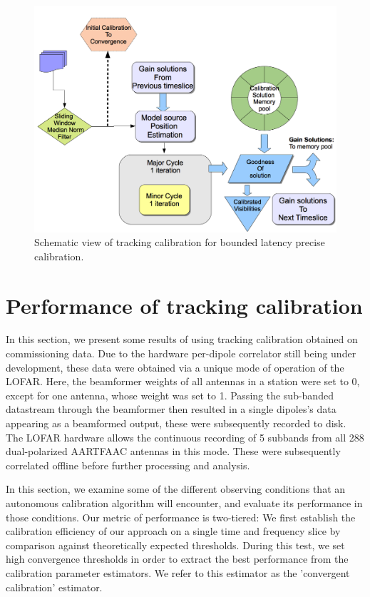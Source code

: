 \documentclass{aa}
\begin{document}
\begin{figure}[tbh]
\includegraphics[width=1\columnwidth]{Figs/tracking_cal_schematic}

\caption{\label{fig:trackcalSchematic}Schematic view of tracking calibration
for bounded latency precise calibration.}
\end{figure}

\section{\label{sec:Performance-of-tracking}Performance of tracking calibration}

In this section, we present  some results of using tracking calibration obtained
on commissioning  data. Due  to the hardware  per-dipole correlator  still being
under development,  these data were obtained  via a unique mode  of operation of
the LOFAR. Here, the beamformer weights of all antennas in a station were set to
0, except  for one antenna,  whose weight was  set to 1. Passing  the sub-banded
datastream  through the  beamformer then  resulted  in a  single dipoles's  data
appearing as a beamformed output,  these were subsequently recorded to disk. The
LOFAR  hardware allows  the  continuous recording  of  5 subbands  from all  288
dual-polarized  AARTFAAC   antennas  in  this  mode.   These  were  subsequently
correlated offline before further processing and analysis.

In this section,  we examine some of the different  observing conditions that an
autonomous calibration algorithm will encounter, and evaluate its performance in
those conditions.  Our metric of  performance is two-tiered: We  first establish
the calibration efficiency of our approach  on a single time and frequency slice
by comparison  against theoretically expected  thresholds. During this  test, we
set high  convergence thresholds in order  to extract the  best performance from
the  calibration  parameter  estimators.  We  refer to  this  estimator  as  the
'convergent calibration' estimator.
\end{document}
